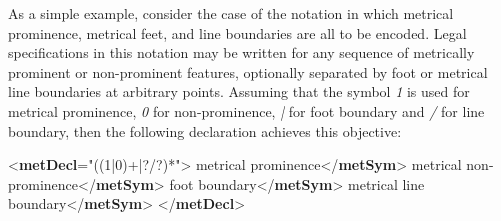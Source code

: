 As a simple example, consider the case of the notation in which metrical prominence, metrical feet, and line boundaries are all to be encoded. Legal specifications in this notation may be written for any sequence of metrically prominent or non-prominent features, optionally separated by foot or metrical line boundaries at arbitrary points. Assuming that the symbol \textit{1} is used for metrical prominence, \textit{0} for non-prominence, \textit{|} for foot boundary and \textit{/} for line boundary, then the following declaration achieves this objective: \par\bgroup{}\exampleFont \begin{shaded}\noindent\mbox{}{<\textbf{metDecl}\hspace*{1em}{pattern}="{((1|0)+⃥|?/?)*}">}\mbox{}\newline 
{}metrical prominence{</\textbf{metSym}>}\mbox{}\newline 
{}metrical non-prominence{</\textbf{metSym}>}\mbox{}\newline 
{}foot boundary{</\textbf{metSym}>}\mbox{}\newline 
{}metrical line boundary{</\textbf{metSym}>}\mbox{}\newline 
{</\textbf{metDecl}>}\end{shaded}\egroup\par \par
